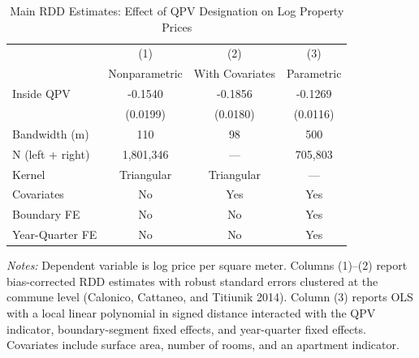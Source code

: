 \begin{table}[htbp]
\centering
\caption{Main RDD Estimates: Effect of QPV Designation on Log Property Prices}
\label{tab:main}
\begin{threeparttable}
\begin{tabular}{lccc}
\toprule
 & (1) & (2) & (3) \\
 & Nonparametric & With Covariates & Parametric \\
\midrule
Inside QPV & -0.1540 & -0.1856 & -0.1269 \\
 & (0.0199) & (0.0180) & (0.0116) \\
\midrule
Bandwidth (m) & 110 & 98 & 500 \\
N (left + right) & 1,801,346 & --- & 705,803 \\
Kernel & Triangular & Triangular & --- \\
Covariates & No & Yes & Yes \\
Boundary FE & No & No & Yes \\
Year-Quarter FE & No & No & Yes \\
\bottomrule
\end{tabular}
\begin{tablenotes}
\small
\item \textit{Notes:} Dependent variable is log price per square meter. Columns (1)--(2) report bias-corrected RDD estimates with robust standard errors clustered at the commune level (Calonico, Cattaneo, and Titiunik 2014). Column (3) reports OLS with a local linear polynomial in signed distance interacted with the QPV indicator, boundary-segment fixed effects, and year-quarter fixed effects. Covariates include surface area, number of rooms, and an apartment indicator.
\end{tablenotes}
\end{threeparttable}
\end{table}
